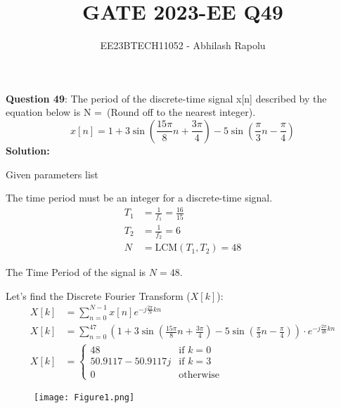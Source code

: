 \documentclass[journal,12pt,twocolumn]{IEEEtran}
\title{GATE 2023-EE Q49}
\author{EE23BTECH11052 - Abhilash Rapolu}
\begin{document}
\maketitle
\newpage
\textbf{Question 49}: The period of the discrete-time signal x[n] described by the equation below is N =\ (Round off to the nearest integer).
$$x[n] = 1 + 3\sin\left(\frac{15\pi}{8}n + \frac{3\pi}{4}\right) - 5\sin\left(\frac{\pi}{3}n - \frac{\pi}{4}\right)$$
\textbf{Solution:}
\begin{table}[htbp]
\centering
 
\caption{Given parameters list}
\end{table}

The time period must be an integer for a discrete-time signal.
\begin{align}
T_1 &= \frac{1}{f_1} = \frac{16}{15} \\
T_2 &= \frac{1}{f_2} = 6 \\
N &= \text{LCM}(T_1, T_2) = 48
\end{align}

The Time Period of the signal is \(N = 48\).

Let's find the Discrete Fourier Transform (\(X[k]\)):
\begin{align}
X[k] &= \sum_{n=0}^{N-1} x[n]e^{-j\frac{2\pi}{N}kn} \\
X[k] &= \sum_{n=0}^{47} \left(1 + 3\sin\left(\frac{15\pi}{8}n + \frac{3\pi}{4}\right) 
- 5\sin\left(\frac{\pi}{3}n - \frac{\pi}{4}\right)\right) \cdot e^{-j\frac{2\pi}{48}kn} \\
X[k] &= \begin{cases}
    48 & \text{if } k = 0 \\
    50.9117 - 50.9117j & \text{if } k = 3 \\
    0 & \text{otherwise}
\end{cases}
\end{align}

\begin{figure}[!ht] 
\centering
\texttt{[image: Figure1.png]}
\label{fig:Graph1}
\end{figure}
\end{document}

